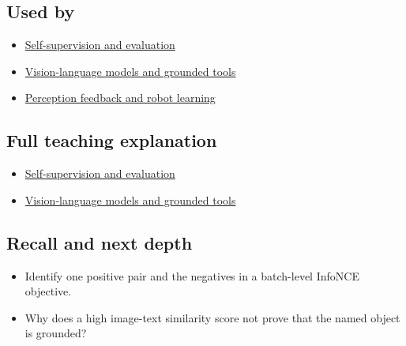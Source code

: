 \subsection{Used by}\label{used-by}

\begin{itemize}
\tightlist
\item
  \href{Continuous\%20Notes/University\%20-\%20Worlds,\%20Images\%20and\%20Inference\%20-\%20Graphics,\%20Vision\%20and\%20Photography\#Self-supervision\%20and\%20evaluation}{Self-supervision and evaluation}
\item
  \href{Continuous\%20Notes/University\%20-\%20Worlds,\%20Images\%20and\%20Inference\%20-\%20Graphics,\%20Vision\%20and\%20Photography\#Vision-language\%20models\%20and\%20grounded\%20tools}{Vision-language models and grounded tools}
\item
  \hyperref[appendix-b0c42da325f1]{Perception feedback and robot learning}
\end{itemize}

\subsection{Full teaching explanation}\label{full-teaching-explanation}

\begin{itemize}
\tightlist
\item
  \href{Continuous\%20Notes/University\%20-\%20Worlds,\%20Images\%20and\%20Inference\%20-\%20Graphics,\%20Vision\%20and\%20Photography\#Self-supervision\%20and\%20evaluation}{Self-supervision and evaluation}
\item
  \href{Continuous\%20Notes/University\%20-\%20Worlds,\%20Images\%20and\%20Inference\%20-\%20Graphics,\%20Vision\%20and\%20Photography\#Vision-language\%20models\%20and\%20grounded\%20tools}{Vision-language models and grounded tools}
\end{itemize}

\subsection{Recall and next depth}\label{recall-and-next-depth}

\begin{itemize}
\tightlist
\item
  Identify one positive pair and the negatives in a batch-level InfoNCE objective.
\item
  Why does a high image-text similarity score not prove that the named object is grounded?
\end{itemize}

